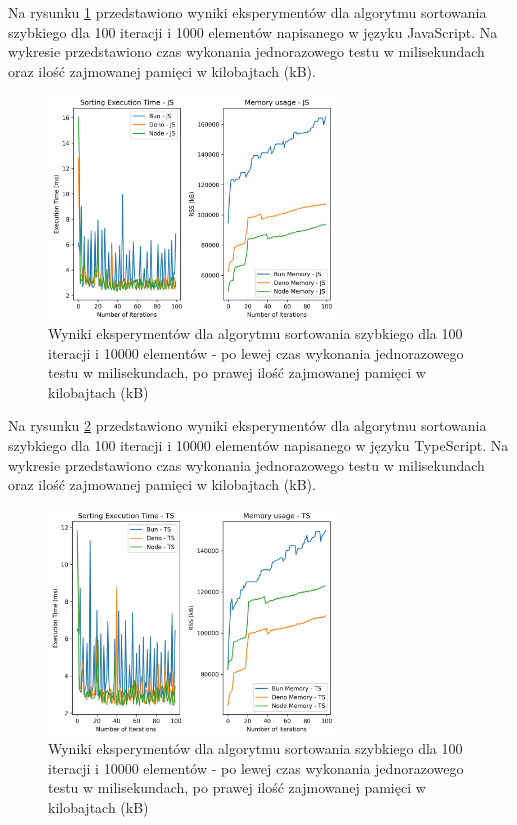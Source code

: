 Na rysunku \ref{fig:quick_sorting_e2} przedstawiono wyniki eksperymentów dla algorytmu sortowania szybkiego dla 100 iteracji i 1000 elementów napisanego w języku JavaScript. Na wykresie przedstawiono czas wykonania jednorazowego testu w milisekundach oraz ilość zajmowanej pamięci w kilobajtach (kB).

\begin{figure}[H]
  \centering
  \includegraphics[width=0.68\textwidth]{Figures/sorting/sorting_quick_100_10000_js.png}
  \caption{Wyniki eksperymentów dla algorytmu sortowania szybkiego dla 100 iteracji i 10000 elementów - po lewej czas wykonania jednorazowego testu w milisekundach, po prawej ilość zajmowanej pamięci w kilobajtach (kB)}
  \label{fig:quick_sorting_e2}
\end{figure}

Na rysunku \ref{fig:quick_sorting_e2_ts} przedstawiono wyniki eksperymentów dla algorytmu sortowania szybkiego dla 100 iteracji i 10000 elementów napisanego w języku TypeScript. Na wykresie przedstawiono czas wykonania jednorazowego testu w milisekundach oraz ilość zajmowanej pamięci w kilobajtach (kB).

\begin{figure}[H]
  \centering
  \includegraphics[width=0.68\textwidth]{Figures/sorting/sorting_quick_100_10000_ts.png}
  \caption{Wyniki eksperymentów dla algorytmu sortowania szybkiego dla 100 iteracji i 10000 elementów - po lewej czas wykonania jednorazowego testu w milisekundach, po prawej ilość zajmowanej pamięci w kilobajtach (kB)}
  \label{fig:quick_sorting_e2_ts}
\end{figure}

